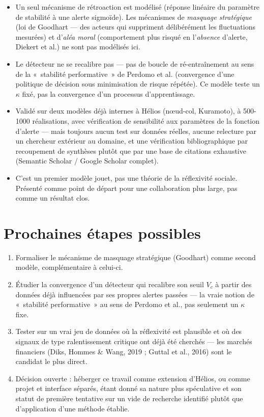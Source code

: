 \documentclass[11pt,a4paper]{article}
\begin{document}
\begin{limite}
\begin{itemize}[leftmargin=1.4em]
\item Un seul mécanisme de rétroaction est modélisé (réponse linéaire du
  paramètre de stabilité à une alerte sigmoïde). Les mécanismes de
  \emph{masquage stratégique} (loi de Goodhart — des acteurs qui
  suppriment délibérément les fluctuations mesurées) et d'\emph{aléa
  moral} (comportement plus risqué en l'\emph{absence} d'alerte,
  Diekert et al.) ne sont pas modélisés ici.
\item Le détecteur ne se recalibre pas — pas de boucle de ré-entraînement
  au sens de la «~stabilité performative~» de Perdomo et al.
  (convergence d'une politique de décision sous minimisation de risque
  répétée). Ce modèle teste un $\kappa$ fixé, pas la convergence d'un
  processus d'apprentissage.
\item Validé sur deux modèles déjà internes à Hélios (nœud-col,
  Kuramoto), à 500-1000 réalisations, avec vérification de sensibilité
  aux paramètres de la fonction d'alerte — mais toujours aucun test sur
  données réelles, aucune relecture par un chercheur extérieur au
  domaine, et une vérification bibliographique par recoupement de
  synthèses plutôt que par une base de citations exhaustive
  (Semantic Scholar / Google Scholar complet).
\item C'est un premier modèle jouet, pas une théorie de la réflexivité
  sociale. Présenté comme point de départ pour une collaboration plus
  large, pas comme un résultat clos.
\end{itemize}
\end{limite}

\section{Prochaines étapes possibles}

\begin{enumerate}[leftmargin=1.4em]
\item Formaliser le mécanisme de masquage stratégique (Goodhart) comme
  second modèle, complémentaire à celui-ci.
\item Étudier la convergence d'un détecteur qui recalibre son seuil
  $V_c$ à partir des données déjà influencées par ses propres alertes
  passées — la vraie notion de «~stabilité performative~» au sens
  de Perdomo et al., pas seulement un $\kappa$ fixe.
\item Tester sur un vrai jeu de données où la réflexivité est plausible
  et où des signaux de type ralentissement critique ont déjà été
  cherchés — les marchés financiers (Diks, Hommes \& Wang, 2019 ;
  Guttal et al., 2016) sont le candidat le plus direct.
\item Décision ouverte : héberger ce travail comme extension d'Hélios,
  ou comme projet et interface séparés, étant donné sa nature plus
  spéculative et son statut de première tentative sur un vide de
  recherche identifié plutôt que d'application d'une méthode établie.
\end{enumerate}
\end{document}
